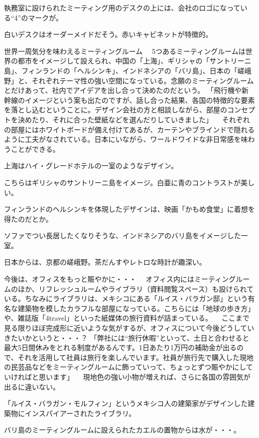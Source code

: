 \documentclass[a4paper,12pt]{jsreport}
\begin{document}
執務室に設けられたミーティング用のデスクの上には、会社のロゴになっている“4”のマークが。

白いデスクはオーダーメイドだそう。赤いキャビネットが特徴的。

世界一周気分を味わえるミーティングルーム
　5つあるミーティングルームは世界の都市をイメージして設えられ、中国の「上海」、ギリシャの「サントリーニ島」、フィンランドの「ヘルシンキ」、インドネシアの「バリ島」、日本の「嵯峨野」と、それぞれテーマ性の強い空間になっている。念願のミーティングルームとだけあって、社内でアイデアを出し合って決めたのだという。
「飛行機や新幹線のイメージという案も出たのですが、話し合った結果、各国の特徴的な要素を落とし込むということに。デザイン会社の方と相談しながら、部屋のコンセプトを決めたり、それに合った壁紙などを選んだりしていきました」
　それぞれの部屋にはホワイトボードが備え付けてあるが、カーテンやブラインドで隠れるように工夫がなされている。日本にいながら、ワールドワイドな非日常感を味わうことができる。

上海はハイ・グレードホテルの一室のようなデザイン。

こちらはギリシャのサントリーニ島をイメージ。白亜に青のコントラストが美しい。

フィンランドのヘルシンキを体現したデザインは、映画「かもめ食堂」に着想を得たのだとか。

ソファでつい長居したくなりそうな、インドネシアのバリ島をイメージした一室。

日本からは、京都の嵯峨野。茶だんすやレトロな時計が趣深い。

今後は、オフィスをもっと賑やかに・・・ 
　オフィス内にはミーティングルームのほか、リフレッシュルームやライブラリ（資料閲覧スペース）も設けられている。ちなみにライブラリは、メキシコにある「ルイス・バラガン邸」という有名な建築物を模したカラフルな部屋になっている。こちらには「地球の歩き方」や、雑誌版「4travel」といった紙媒体の旅行資料が詰まっている。
　ここまで見る限りほぼ完成形に近いような気がするが、オフィスについて今後どうしていきたいかというと・・・？
「弊社には“旅行休暇”といって、土日と合わせると最大5日間休みをとれる制度があるんです。1日あたり1万円の補助金が出るので、それを活用して社員は旅行を楽しんでいます。社員が旅行先で購入した現地の民芸品などをミーティングルームに飾っていって、ちょっとずつ賑やかにしていければと思います」
　現地色の強い小物が増えれば、さらに各国の雰囲気が出るに違いない。

「ルイス・バラガン・モルフィン」というメキシコ人の建築家がデザインした建築物にインスパイアーされたライブラリ。

バリ島のミーティングルームに設えられたカエルの置物からは水が・・・。
\end{document}
